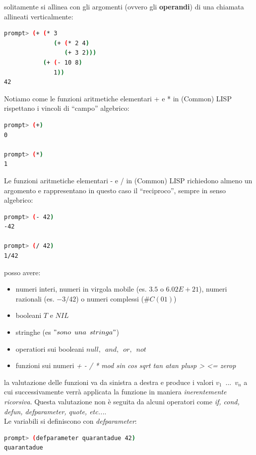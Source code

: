 \documentclass[a4paper,12pt, oneside]{book}
\begin{document}
solitamente si allinea con gli argomenti (ovvero gli \textbf{operandi}) di una chiamata allineati verticalmente:
\begin{shaded}
\begin{lstlisting}[language=bash]
prompt> (+ (* 3
              (+ (* 2 4)
                 (+ 3 2)))
           (+ (- 10 8)
              1))
42
\end{lstlisting}
\end{shaded}
Notiamo come le funzioni aritmetiche elementari + e * in (Common) LISP
rispettano i vincoli di “campo” algebrico:
\begin{shaded}
\begin{lstlisting}[language=bash]
prompt> (+)
0

prompt> (*)
1
\end{lstlisting}
\end{shaded}
Le funzioni aritmetiche elementari - e / in (Common) LISP richiedono almeno
un argomento e rappresentano in questo caso il “reciproco”, sempre in senso
algebrico:
\begin{shaded}
\begin{lstlisting}[language=bash]
prompt> (- 42)
-42

prompt> (/ 42)
1/42
\end{lstlisting}
\end{shaded}
posso avere:
\begin{itemize}
\item numeri interi, numeri in virgola mobile (es. $3.5$ o $6.02E+21$), numeri razionali (es. $-3/42$) o numeri complessi ($\#C (0 1)$)
\item booleani $T$ e $NIL$
\item stringhe (es $"sono\,\,\, una \,\,\,stringa"$)
\item operatiori sui booleani $null,\,\,\,and,\,\,\, or,\,\,\,not$
\item funzioni sui numeri \textit{+ - / * mod sin cos sqrt tan atan plusp > <= zerop}
\end{itemize}
la valutazione delle funzioni va da sinistra a destra e produce i valori $v_1\,\,\,...\,\,\, v_n$ a cui successivamente verrà applicata la funzione in maniera \textit{inerentemente ricorsiva}. Questa valutazione non è seguita da alcuni operatori come \textit{if, cond, defun, defparameter, quote, etc...}.\\
Le variabili si definiscono con \textit{defparameter}:
\begin{shaded}
\begin{lstlisting}[language=bash]
prompt> (defparameter quarantadue 42)
quarantadue
\end{lstlisting}
\end{shaded}
\end{document}

